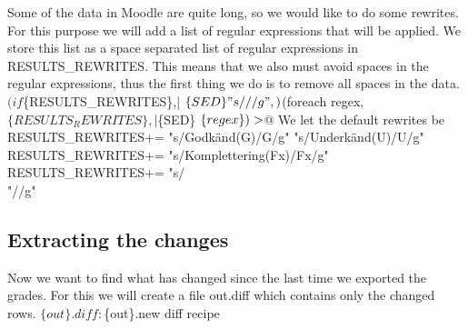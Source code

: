 Some of the data in Moodle are quite long, so we would like to do some 
rewrites.
For this purpose we will add a list of regular expressions that will be 
applied.
We store this list as a space separated list of regular expressions in 
{\Tt{}{\$}{\nwlbrace}RESULTS{\_}REWRITES{\nwrbrace}\nwendquote}.
This means that we also must avoid spaces in the regular expressions, thus the 
first thing we do is to remove all spaces in the data.
\nwenddocs{}\plusendmoddef\nwstartdeflinemarkup{}\nwenddeflinemarkup
$(if $\{RESULTS_REWRITES\},| $\{SED\} "s/ //g", ) \\
$(foreach regex,$\{RESULTS_REWRITES\},| $\{SED\} $\{regex\}) \\
> $@
\nwendcode{}We let the default rewrites be
\nwenddocs{}\plusendmoddef\nwstartdeflinemarkup{}\nwenddeflinemarkup
RESULTS_REWRITES+=  "s/Godkänd(G)/G/g" "s/Underkänd(U)/U/g"
RESULTS_REWRITES+=  "s/Komplettering(Fx)/Fx/g"
RESULTS_REWRITES+=  "s/\\"//g"
\nwendcode{}\nwdocspar

\subsection{Extracting the changes}
\label{FindingChanges}

Now we want to find what has changed since the last time we exported the 
grades.
For this we will create a file {\Tt{}{\$}{\nwlbrace}out{\nwrbrace}.diff\nwendquote} which contains only the changed 
rows.
\nwenddocs{}\plusendmoddef\nwstartdeflinemarkup{}\nwenddeflinemarkup
$\{out\}.diff: $\{out\}.new
  \LA{}diff recipe~{\nwtagstyle{}}\RA{}
\nwendcode{}\nwdocspar

